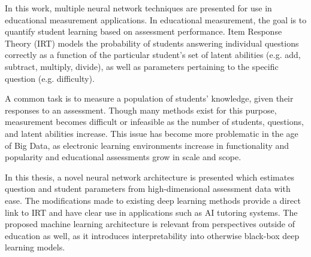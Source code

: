 In this work, multiple neural network techniques are presented for use in educational measurement applications. In educational measurement, the goal is to quantify student learning based on assessment performance. Item Response Theory (IRT) models the probability of students answering individual questions correctly as a function of the particular student's set of latent abilities (e.g. add, subtract, multiply, divide), as well as parameters pertaining to the specific question (e.g. difficulty).

A common task is to measure a population of students' knowledge, given their responses to an assessment. Though many methods exist for this purpose, measurement becomes difficult or infeasible as the number of students, questions, and latent abilities increase. This issue has become more problematic in the age of Big Data, as electronic learning environments increase in functionality and popularity and educational assessments grow in scale and scope.

In this thesis, a novel neural network architecture is presented which estimates question and student parameters from high-dimensional assessment data with ease. The modifications made to existing deep learning methods provide a direct link to IRT and have clear use in applications such as AI tutoring systems. The proposed machine learning architecture is relevant from perspectives outside of education as well, as it introduces interpretability into otherwise black-box deep learning models.

